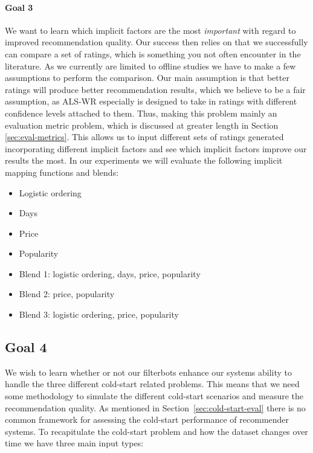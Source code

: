 \paragraph{Goal 3}

We want to learn which implicit factors are the most \emph{important} with regard to
improved recommendation quality. Our success then relies on that we successfully can compare
a set of ratings, which is something you not often encounter in the literature. As we currently
are limited to offline studies we have to make a few assumptions to perform the comparison.
Our main assumption is that better ratings will produce better recommendation results,
which we believe to be a fair assumption, as ALS-WR especially is designed to take
in ratings with different confidence levels attached to them. Thus, making this
problem mainly an evaluation metric problem, which is discussed at greater
length in Section \ref{sec:eval-metrics}. This allows us to input different sets
of ratings generated incorporating different implicit factors and see which implicit
factors improve our results the most. In our experiments we will evaluate the following
implicit mapping functions and blends:

\begin{itemize}
\item Logistic ordering 
\item Days
\item Price
\item Popularity
\item Blend 1: logistic ordering, days, price, popularity
\item Blend 2: price, popularity
\item Blend 3: logistic ordering, price, popularity
\end{itemize}

\subsection{Goal 4}
\label{cold-start-methodology}

We wish to learn whether or not our filterbots enhance our systems ability to handle
the three different cold-start related problems. This means that we need some methodology
to simulate the different cold-start scenarios and measure the recommendation quality.
As mentioned in Section~\ref{sec:cold-start-eval} there is no common framework for assessing 
the cold-start performance of recommender systems. To recapitulate the cold-start problem and how
the dataset changes over time we have three main input types:

